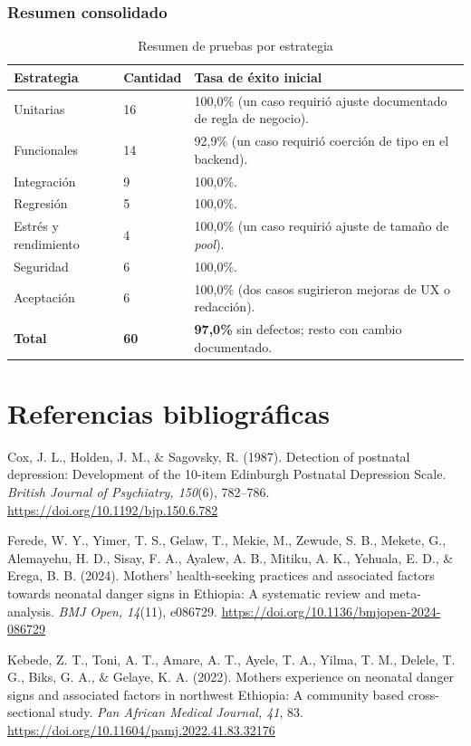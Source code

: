 \documentclass[12pt,letterpaper]{article}
\begin{document}
\subsubsection{Resumen consolidado}

\begin{longtable}{p{}p{}p{}}
\caption{Resumen de pruebas por estrategia}\\\toprule
\textbf{Estrategia} & \textbf{Cantidad} & \textbf{Tasa de éxito inicial} \\\midrule
\endhead
Unitarias & 16 & 100,0\% (un caso requirió ajuste documentado de regla de negocio).\\\hline
Funcionales & 14 & 92,9\% (un caso requirió coerción de tipo en el backend).\\\hline
Integración & 9 & 100,0\%.\\\hline
Regresión & 5 & 100,0\%.\\\hline
Estrés y rendimiento & 4 & 100,0\% (un caso requirió ajuste de tamaño de \textit{pool}).\\\hline
Seguridad & 6 & 100,0\%.\\\hline
Aceptación & 6 & 100,0\% (dos casos sugirieron mejoras de UX o redacción).\\\hline
\textbf{Total} & \textbf{60} & \textbf{97,0\%} sin defectos; resto con cambio documentado.\\\bottomrule
\end{longtable}

\section{Referencias bibliográficas}

Cox, J. L., Holden, J. M., \& Sagovsky, R. (1987). Detection of postnatal depression: Development of the 10-item Edinburgh Postnatal Depression Scale. \textit{British Journal of Psychiatry, 150}(6), 782--786. \url{https://doi.org/10.1192/bjp.150.6.782}

Ferede, W. Y., Yimer, T. S., Gelaw, T., Mekie, M., Zewude, S. B., Mekete, G., Alemayehu, H. D., Sisay, F. A., Ayalew, A. B., Mitiku, A. K., Yehuala, E. D., \& Erega, B. B. (2024). Mothers' health-seeking practices and associated factors towards neonatal danger signs in Ethiopia: A systematic review and meta-analysis. \textit{BMJ Open, 14}(11), e086729. \url{https://doi.org/10.1136/bmjopen-2024-086729}

Kebede, Z. T., Toni, A. T., Amare, A. T., Ayele, T. A., Yilma, T. M., Delele, T. G., Biks, G. A., \& Gelaye, K. A. (2022). Mothers experience on neonatal danger signs and associated factors in northwest Ethiopia: A community based cross-sectional study. \textit{Pan African Medical Journal, 41}, 83. \url{https://doi.org/10.11604/pamj.2022.41.83.32176}
\end{document}

